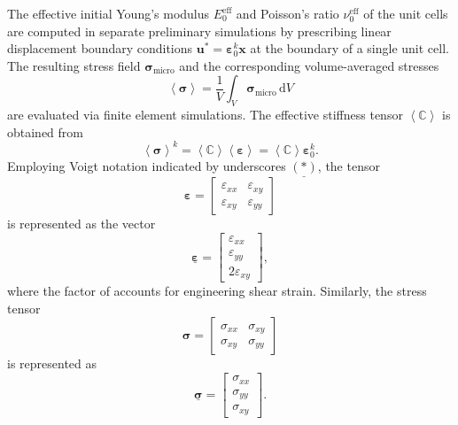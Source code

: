 \documentclass[pdflatex,sn-mathphys-num]{sn-jnl}%
\theoremstyle{thmstyleone}%
\theoremstyle{thmstyletwo}%
\theoremstyle{thmstylethree}%
\begin{document}
The effective initial Young’s modulus $E_0^{\text{eff}}$ and Poisson’s ratio $\nu_0^{\text{eff}}$ of the unit cells are computed in separate preliminary simulations by prescribing linear displacement boundary conditions $\boldsymbol{u}^* = \boldsymbol{\varepsilon}_0^k \boldsymbol{x}$ at the boundary of a single unit cell.
The resulting stress field $\boldsymbol{\sigma}_{\text{micro}}$ and the corresponding volume-averaged stresses
\begin{equation}
    \left< \boldsymbol{\sigma} \right> = \dfrac{1}{V} \int_V \boldsymbol{\sigma}_{\text{micro}} \, \mathrm{d}V
\end{equation}
are evaluated via finite element simulations. The effective stiffness tensor $\left< \boldsymbol{\mathbb{C}} \right>$ is obtained from
\begin{equation}
    \left< \boldsymbol{\sigma} \right>^k = \left< \boldsymbol{\mathbb{C}} \right>  \left< \boldsymbol{\varepsilon} \right> = \left< \boldsymbol{\mathbb{C}} \right>  \boldsymbol{\varepsilon}_0^k.
\end{equation}
Employing Voigt notation indicated by underscores $\underline{(*)}$, the  tensor
\[
\boldsymbol{\varepsilon} = 
\begin{bmatrix} \varepsilon_{xx} & \varepsilon_{xy} \\ \varepsilon_{xy} & \varepsilon_{yy} \end{bmatrix}
\]
is represented as the  vector
\begin{equation}
\underline{\boldsymbol{\varepsilon}} = 
\begin{bmatrix} \varepsilon_{xx} \\ \varepsilon_{yy} \\ 2 \varepsilon_{xy} \end{bmatrix},
\end{equation}
where the factor of  accounts for engineering shear strain. Similarly, the stress tensor
\[
\boldsymbol{\sigma} = 
\begin{bmatrix} \sigma_{xx} & \sigma_{xy} \\ \sigma_{xy} & \sigma_{yy} \end{bmatrix}
\]
is represented as
\begin{equation}
\underline{\boldsymbol{\sigma}} = 
\begin{bmatrix} \sigma_{xx} \\ \sigma_{yy} \\ \sigma_{xy} \end{bmatrix}.
\end{equation}
\end{document}
